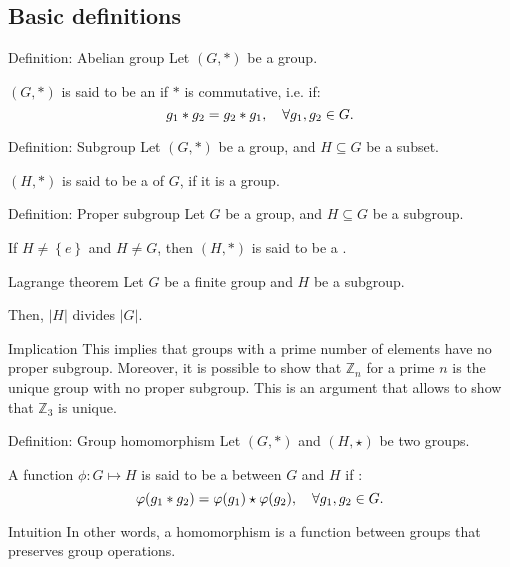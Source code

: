 \documentclass[a4paper]{article}
\begin{document}
\subsection{Basic definitions}

\begin{parag}{Definition: Abelian group}
    Let $\left(G, *\right)$ be a group.

    $\left(G, *\right)$ is said to be an  if $*$ is commutative, i.e. if:
    \[g_1 * g_2 = g_2 * g_1, \quad \forall g_1, g_2 \in G.\]
\end{parag}

\begin{parag}{Definition: Subgroup}
    Let $\left(G, *\right)$ be a group, and $H \subseteq G$ be a subset.

    $\left(H, *\right)$ is said to be a  of $G$, if it is a group.
\end{parag}

\begin{parag}{Definition: Proper subgroup}
    Let $G$ be a group, and $H \subseteq G$ be a subgroup.

    If $H \neq \left\{e\right\}$ and $H \neq G$, then $\left(H, *\right)$ is said to be a .
\end{parag}

\begin{parag}{Lagrange theorem}
    Let $G$ be a finite group and $H$ be a subgroup.

    Then, $\left|H\right|$ divides $\left|G\right|$.

    \begin{subparag}{Implication}
        This implies that groups with a prime number of elements have no proper subgroup. Moreover, it is possible to show that $\mathbb{Z}_n$ for a prime $n$ is the unique group with no proper subgroup. This is an argument that allows to show that $\mathbb{Z}_3$ is unique.
    \end{subparag}
\end{parag}

\begin{parag}{Definition: Group homomorphism}
    Let $\left(G, *\right)$ and $\left(H, \star\right)$ be two groups.

    A function $\phi: G \mapsto H$ is said to be a  between $G$ and $H$ if : 
    \[\phi\left(g_1 * g_2\right) = \phi\left(g_1\right) \star \phi\left(g_2\right), \mathspace \forall g_1, g_2 \in G.\]

    \begin{subparag}{Intuition}
        In other words, a homomorphism is a function between groups that preserves group operations. 
    \end{subparag}
\end{parag}
\end{document}

